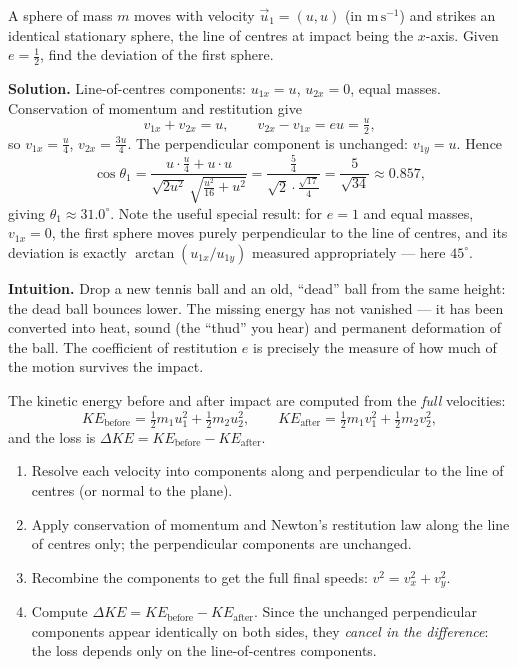 \documentclass[11pt]{article}
\newcounter{popsec}
\newcounter{popsub}
\newcommand{\courssub}[1]{%
  \stepcounter{popsub}%
  \par\vspace{9pt}\noindent{\popxbold\fontsize{11.5}{13}\selectfont\color{popink}{\color{poporange}\thepopsec.\thepopsub}\hspace{6pt}#1}\par\nopagebreak\vspace{4pt}
}
\begin{document}
\begin{exemplebox}
A sphere of mass $m$ moves with velocity $\vec{u}_1 = (u, u)$ (in $\mathrm{m\,s^{-1}}$) and strikes an identical stationary sphere, the line of centres at impact being the $x$-axis. Given $e = \tfrac{1}{2}$, find the deviation of the first sphere.

\textbf{Solution.} Line-of-centres components: $u_{1x} = u$, $u_{2x} = 0$, equal masses. Conservation of momentum and restitution give
\[
v_{1x} + v_{2x} = u, \qquad v_{2x} - v_{1x} = eu = \tfrac{u}{2},
\]
so $v_{1x} = \tfrac{u}{4}$, $v_{2x} = \tfrac{3u}{4}$. The perpendicular component is unchanged: $v_{1y} = u$. Hence
\[
\cos\theta_1 = \frac{u\cdot\tfrac{u}{4} + u\cdot u}{\sqrt{2u^2}\,\sqrt{\tfrac{u^2}{16}+u^2}} = \frac{\tfrac{5}{4}}{\sqrt{2}\cdot\tfrac{\sqrt{17}}{4}} = \frac{5}{\sqrt{34}} \approx 0.857,
\]
giving $\theta_1 \approx 31.0^\circ$. Note the useful special result: for $e = 1$ and equal masses, $v_{1x} = 0$, the first sphere moves purely perpendicular to the line of centres, and its deviation is exactly $\arctan(u_{1x}/u_{1y})$ measured appropriately — here $45^\circ$.
\end{exemplebox}

\courssub{Kinetic Energy Lost During Impact}

\textbf{Intuition.} Drop a new tennis ball and an old, ``dead'' ball from the same height: the dead ball bounces lower. The missing energy has not vanished — it has been converted into heat, sound (the ``thud'' you hear) and permanent deformation of the ball. The coefficient of restitution $e$ is precisely the measure of how much of the motion survives the impact.

The kinetic energy before and after impact are computed from the \emph{full} velocities:
\[
KE_{\text{before}} = \tfrac{1}{2}m_1 u_1^2 + \tfrac{1}{2}m_2 u_2^2, \qquad KE_{\text{after}} = \tfrac{1}{2}m_1 v_1^2 + \tfrac{1}{2}m_2 v_2^2,
\]
and the loss is $\Delta KE = KE_{\text{before}} - KE_{\text{after}}$.

\begin{methode}
\begin{enumerate}
  \item Resolve each velocity into components along and perpendicular to the line of centres (or normal to the plane).
  \item Apply conservation of momentum and Newton's restitution law along the line of centres only; the perpendicular components are unchanged.
  \item Recombine the components to get the full final speeds: $v^2 = v_x^2 + v_y^2$.
  \item Compute $\Delta KE = KE_{\text{before}} - KE_{\text{after}}$. Since the unchanged perpendicular components appear identically on both sides, they \emph{cancel in the difference}: the loss depends only on the line-of-centres components.
\end{enumerate}
\end{methode}
\end{document}
